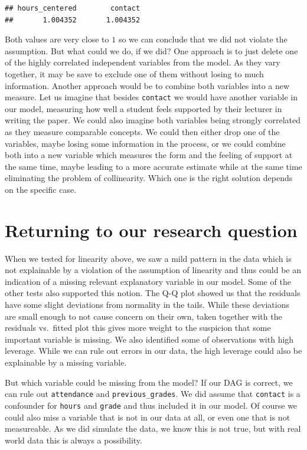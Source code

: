 \documentclass[
]{book}
\begin{document}
\begin{verbatim}
## hours_centered        contact 
##       1.004352       1.004352
\end{verbatim}

Both values are very close to \(1\) so we can conclude that we did not violate
the assumption. But what could we do, if we did? One approach is to just delete
one of the highly correlated independent variables from the model. As they vary
together, it may be save to exclude one of them without losing to much
information. Another approach would be to combine both variables into a new
measure. Let us imagine that besides \texttt{contact} we would have another variable in
our model, measuring how well a student feels supported by their lecturer in
writing the paper. We could also imagine both variables being strongly
correlated as they measure comparable concepts. We could then either drop one of
the variables, maybe losing some information in the process, or we could combine
both into a new variable which measures the form and the feeling of support at
the same time, maybe leading to a more accurate estimate while at the same time
eliminating the problem of collinearity. Which one is the right solution
depends on the specific case.

\hypertarget{returning-to-our-research-question-1}{%
\section{Returning to our research question}\label{returning-to-our-research-question-1}}

When we tested for linearity above, we saw a mild pattern in the data which is
not explainable by a violation of the assumption of linearity and thus could be
an indication of a missing relevant explanatory variable in our model. Some of
the other tests also supported this notion. The Q-Q plot showed us that the
residuals have some slight deviations from normality in the tails. While these
deviations are small enough to not cause concern on their own, taken together
with the residuals vs.~fitted plot this gives more weight to the suspicion that
some important variable is missing. We also identified some of observations with
high leverage. While we can rule out errors in our data, the high leverage could
also be explainable by a missing variable.

But which variable could be missing from the model?
If our DAG is correct, we can rule out \texttt{attendance} and
\texttt{previous\_grades}. We did assume that \texttt{contact} is a confounder for \texttt{hours} and
\texttt{grade} and thus included it in our model. Of course we
could also miss a variable that is not in our data at all, or even one that is
not measureable. As we did simulate the data, we know this is not true, but with
real world data this is always a possibility.
\end{document}
